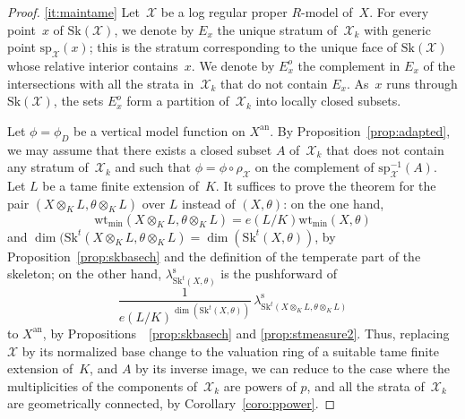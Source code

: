 \documentclass[JEP,XML,SOM,Unicode,NoFloatCountersInSection]{cedram}
\theoremstyle{definition}
\numberwithin{equation}{subsection}
\newcommand{\cX}{\ensuremath{\mathscr{X}}}
\newcommand{\an}{\mathrm{an}}
\newcommand{\Sk}{\mathrm{Sk}}
\newcommand{\spe}{\mathrm{sp}}
\newcommand{\rs}{\mathrm{s}}
\newcommand{\wt}{\mathrm{wt}}
\let\form\theta
\let\Leb\lambda
\begin{document}
\skpt
\begin{proof}
\eqref{it:maintame}
Let~$\cX$ be a log regular proper $R$\nobreakdash-model of~$X$.
For every point~$x$ of $\Sk(\cX)$, we denote by $E_x$ the unique stratum of~$\cX_k$ with generic point $\spe_{\cX}(x)$; this is the stratum corresponding to the unique face of $\Sk(\cX)$ whose relative interior contains~$x$. We denote by $E_x^o$ the complement in $E_x$ of the intersections with all the strata in~$\cX_k$ that do not contain $E_x$.
As~$x$ runs through $\Sk(\cX)$, the sets $E_x^o$ form a partition of~$\cX_k$ into locally closed subsets.

Let $\phi=\phi_D$ be a vertical model function on $X^{\an}$. By Proposition~\ref{prop:adapted}, we may assume that there exists a closed subset $A$ of~$\cX_k$ that does not contain any stratum of~$\cX_k$ and such that
$\phi=\phi\circ \rho_{\cX}$ on the complement of $\spe^{-1}_{\cX}(A)$.
Let $L$ be a tame finite extension of~$K$. It suffices to prove the theorem for the pair $(X\otimes_K L,\form\otimes_K L)$ over $L$ instead of $(X,\form)$: on the one hand,
\[
\wt_{\min}(X\otimes_K L,\form\otimes_K L)=e(L/K)\wt_{\min}(X,\form)
\]
and $\dim(\Sk^t(X\otimes_K L,\form\otimes_K L)=\dim(\Sk^t(X,\form))$, by Proposition~\ref{prop:skbasech} and the definition of the temperate part of the skeleton; on the other hand,
$\Leb^{\rs}_{\Sk^t(X,\form)}$ is the pushforward of
\[
\frac{1}{e(L/K)^{\dim(\Sk^t(X,\form))}}\,\Leb^{\rs}_{\Sk^t(X\otimes_K L,\form\otimes_K L)}
\]
to $X^{\an}$, by Propositions~~\ref{prop:skbasech} and \ref{prop:stmeasure2}. Thus, replacing~$\cX$ by its normalized base change to the valuation ring of a suitable tame finite extension of~$K$, and $A$ by its inverse image, we can reduce to the case where the multiplicities of the components of~$\cX_k$ are powers of $p$, and all the strata of~$\cX_k$ are geometrically connected, by Corollary~\ref{coro:ppower}.


\end{proof}
\end{document}
